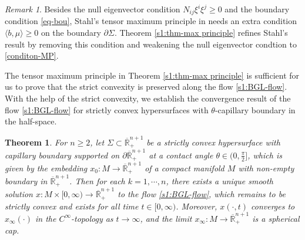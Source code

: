 \documentclass[11pt,reqno]{amsart}
\newtheorem{thm}{Theorem}[section]
\theoremstyle{definition}
\theoremstyle{remark}
\newtheorem{rem}{Remark}
\numberwithin{equation}{section}
\renewcommand{\(}{\left(}
\renewcommand{\)}{\right)}
\renewcommand{\-}{\overline}
\newcommand{\ra}{\rightarrow}
\begin{document}
\begin{rem}
	Besides the null eigenvector condition $N_{ij}\xi^i\xi^j\geq 0$  and the boundary condition \eqref{eq-bou}, Stahl's tensor maximum principle in \cite[Theorem 3.3]{Stahl1996-2} needs an extra condition $\langle b,\mu\rangle\geq0$  on the boundary $\partial\Sigma$. Theorem \ref{s1:thm-max principle} refines Stahl's result by removing this condition and weakening the null eigenvector condtion to \eqref{conditon-MP}.
\end{rem}

The tensor maximum principle in Theorem \ref{s1:thm-max principle} is sufficient for us to prove that the strict convexity is preserved along the flow \eqref{s1:BGL-flow}. With the help of the strict convexity, we establish the convergence result of the flow \eqref{s1:BGL-flow} for strictly convex hypersurfaces with $\theta$-capillary boundary in the half-space.
\begin{thm}\label{s1:thm-convergence}
For $n\geq 2$, let $\Sigma\subset \-{\mathbb R}_{+}^{n+1}$ be a strictly convex hypersurface with capillary boundary supported on $\partial\-{\mathbb R}_{+}^{n+1}$ at a contact angle $\theta\in (0,\frac{\pi}{2}]$, which is given by the embedding $x_0:M \ra \-{\mathbb R}_{+}^{n+1}$ of a compact manifold $M$ with non-empty boundary in $\-{\mathbb R}_{+}^{n+1}$. Then for each $k=1,\cdots,n$, there exists a unique smooth solution $x:M\times [0,\infty)\ra \-{\mathbb R}_{+}^{n+1}$ to the flow \eqref{s1:BGL-flow}, which remains to be strictly convex and exists for all time $t\in [0,\infty)$. Moreover, $x(\cdot,t)$ converges to $x_\infty(\cdot)$ in the $C^\infty$-topology as $t\ra \infty$, and the limit $x_\infty:M\ra \-{\mathbb R}_+^{n+1}$ is a spherical cap.
\end{thm}
\end{document}
